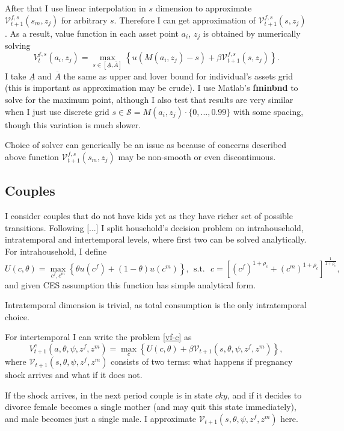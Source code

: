 After that I use linear interpolation in $s$ dimension to approximate $\mathcal{V}^{f,s}_{t+1}(s_m,z_j)$ for arbitrary $s$. Therefore I can get approximation of $\mathcal{V}^{f,s}_{t+1}(s,z_j)$. As a result, value function in each asset point $a_i$, $z_j$ is obtained by numerically solving
\[V^{f,s}_t(a_i,z_j) = \max\limits_{s \in [\underline{A},\overline{A}]} \left\{ u(M(a_i,z_j) - s) + \beta \mathcal{V}^{f,s}_{t+1}(s,z_j)\right\}.\]
I take $\underline{A}$ and $\overline{A}$ the same as upper and lover bound for individual's assets grid (this is important as approximation may be crude). I use Matlab's \textbf{fminbnd} to solve for the maximum point, although I also test that results are very similar when I just use discrete grid $s \in \mathcal{S} = M(a_i,z_j) \cdot\{0,...,0.99\}$ with some spacing, though this variation is much slower.

Choice of solver can generically be an issue as because of concerns described above function $\mathcal{V}^{f,s}_{t+1}(s_m,z_j)$ may be non-smooth or even discontinuous.

\subsection{Couples}
I consider couples that do not have kids yet as they have richer set of possible transitions.  Following [...] I split household's decision problem on intrahousehold, intratemporal and intertemporal levels, where first two can be solved analytically. For intrahousehold, I define
\[U(c,\theta) = \max\limits_{c^f,c^m} \left\{\theta u(c^f)  + (1-\theta)u(c^m) \right\}, \ \ \text{s.t.} \ \ \ c = \left[ (c^f)^{1+\rho_c} + (c^m)^{1+\rho_c}\right]^{\frac1{1+\rho_c}},\]
and given CES assumption this function has simple analytical form.

Intratemporal dimension is trivial, as total consumption is the only intratemporal choice.

For intertemporal I can write the problem \ref{vf-c} as
\[V^{c}_{t+1}(a,\theta,\psi,z^f,z^m) = \max\limits_{c} \left\{ U(c,\theta) + \beta \mathcal{V}_{t+1}(s,\theta,\psi,z^f,z^m) \right\},\]
where $\mathcal{V}_{t+1}(s,\theta,\psi,z^f,z^m)$ consists of two terms: what happens if pregnancy shock arrives and what if it does not.

If the shock arrives, in the next period couple is in state $cky$, and if it decides to divorce female becomes a single mother (and may quit this state immediately), and male becomes just a single male. I approximate $\mathcal{V}_{t+1}(s,\theta,\psi,z^f,z^m)$ here. 

